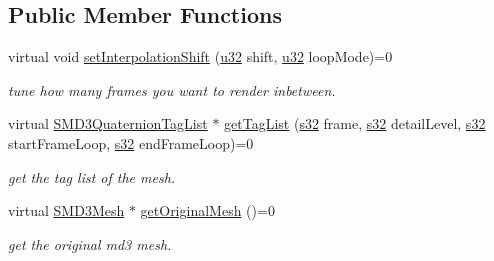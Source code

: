 \subsection*{Public Member Functions}
\begin{DoxyCompactItemize}
\item 
\mbox{\label{classirr_1_1scene_1_1IAnimatedMeshMD3_ae72d5c1bbef975834ddb3fdf8d73e608}} 
virtual void \hyperlink{classirr_1_1scene_1_1IAnimatedMeshMD3_ae72d5c1bbef975834ddb3fdf8d73e608}{set\+Interpolation\+Shift} (\hyperlink{namespaceirr_a0416a53257075833e7002efd0a18e804}{u32} shift, \hyperlink{namespaceirr_a0416a53257075833e7002efd0a18e804}{u32} loop\+Mode)=0
\begin{DoxyCompactList}\small\item\em tune how many frames you want to render inbetween. \end{DoxyCompactList}\item 
\mbox{\label{classirr_1_1scene_1_1IAnimatedMeshMD3_a1de2fa2fc55ab8fb7f881f3e9a9b0d78}} 
virtual \hyperlink{structirr_1_1scene_1_1SMD3QuaternionTagList}{S\+M\+D3\+Quaternion\+Tag\+List} $\ast$ \hyperlink{classirr_1_1scene_1_1IAnimatedMeshMD3_a1de2fa2fc55ab8fb7f881f3e9a9b0d78}{get\+Tag\+List} (\hyperlink{namespaceirr_ac66849b7a6ed16e30ebede579f9b47c6}{s32} frame, \hyperlink{namespaceirr_ac66849b7a6ed16e30ebede579f9b47c6}{s32} detail\+Level, \hyperlink{namespaceirr_ac66849b7a6ed16e30ebede579f9b47c6}{s32} start\+Frame\+Loop, \hyperlink{namespaceirr_ac66849b7a6ed16e30ebede579f9b47c6}{s32} end\+Frame\+Loop)=0
\begin{DoxyCompactList}\small\item\em get the tag list of the mesh. \end{DoxyCompactList}\item 
\mbox{\label{classirr_1_1scene_1_1IAnimatedMeshMD3_ac6b6b53da9413b4404bcad0e68561bcb}} 
virtual \hyperlink{structirr_1_1scene_1_1SMD3Mesh}{S\+M\+D3\+Mesh} $\ast$ \hyperlink{classirr_1_1scene_1_1IAnimatedMeshMD3_ac6b6b53da9413b4404bcad0e68561bcb}{get\+Original\+Mesh} ()=0
\begin{DoxyCompactList}\small\item\em get the original md3 mesh. \end{DoxyCompactList}\end{DoxyCompactItemize}
